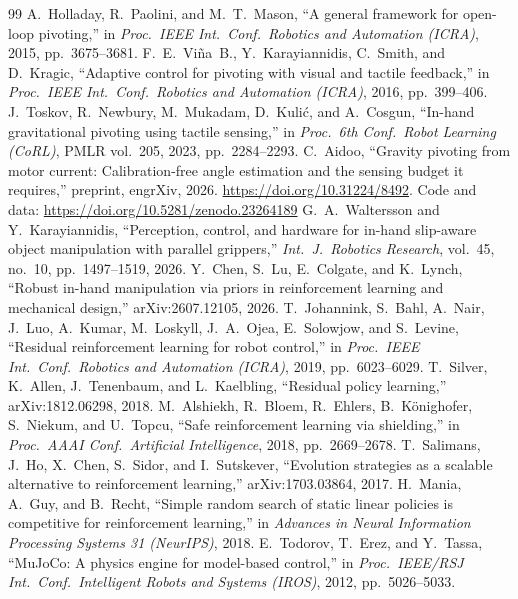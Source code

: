 \documentclass[11pt]{article}
\begin{document}
\begin{thebibliography}{99}
 A.~Holladay, R.~Paolini, and M.~T.~Mason, ``A general framework for open-loop pivoting,'' in \emph{Proc.\ IEEE Int.\ Conf.\ Robotics and Automation (ICRA)}, 2015, pp.~3675--3681.
 F.~E.~Vi\~na~B., Y.~Karayiannidis, C.~Smith, and D.~Kragic, ``Adaptive control for pivoting with visual and tactile feedback,'' in \emph{Proc.\ IEEE Int.\ Conf.\ Robotics and Automation (ICRA)}, 2016, pp.~399--406.
 J.~Toskov, R.~Newbury, M.~Mukadam, D.~Kuli\'c, and A.~Cosgun, ``In-hand gravitational pivoting using tactile sensing,'' in \emph{Proc.\ 6th Conf.\ Robot Learning (CoRL)}, PMLR vol.~205, 2023, pp.~2284--2293.
 C.~Aidoo, ``Gravity pivoting from motor current: Calibration-free angle estimation and the sensing budget it requires,'' preprint, engrXiv, 2026. \url{https://doi.org/10.31224/8492}. Code and data: \url{https://doi.org/10.5281/zenodo.23264189}
 G.~A.~Waltersson and Y.~Karayiannidis, ``Perception, control, and hardware for in-hand slip-aware object manipulation with parallel grippers,'' \emph{Int.\ J.\ Robotics Research}, vol.~45, no.~10, pp.~1497--1519, 2026.
 Y.~Chen, S.~Lu, E.~Colgate, and K.~Lynch, ``Robust in-hand manipulation via priors in reinforcement learning and mechanical design,'' arXiv:2607.12105, 2026.
 T.~Johannink, S.~Bahl, A.~Nair, J.~Luo, A.~Kumar, M.~Loskyll, J.~A.~Ojea, E.~Solowjow, and S.~Levine, ``Residual reinforcement learning for robot control,'' in \emph{Proc.\ IEEE Int.\ Conf.\ Robotics and Automation (ICRA)}, 2019, pp.~6023--6029.
 T.~Silver, K.~Allen, J.~Tenenbaum, and L.~Kaelbling, ``Residual policy learning,'' arXiv:1812.06298, 2018.
 M.~Alshiekh, R.~Bloem, R.~Ehlers, B.~K\"onighofer, S.~Niekum, and U.~Topcu, ``Safe reinforcement learning via shielding,'' in \emph{Proc.\ AAAI Conf.\ Artificial Intelligence}, 2018, pp.~2669--2678.
 T.~Salimans, J.~Ho, X.~Chen, S.~Sidor, and I.~Sutskever, ``Evolution strategies as a scalable alternative to reinforcement learning,'' arXiv:1703.03864, 2017.
 H.~Mania, A.~Guy, and B.~Recht, ``Simple random search of static linear policies is competitive for reinforcement learning,'' in \emph{Advances in Neural Information Processing Systems 31 (NeurIPS)}, 2018.
 E.~Todorov, T.~Erez, and Y.~Tassa, ``MuJoCo: A physics engine for model-based control,'' in \emph{Proc.\ IEEE/RSJ Int.\ Conf.\ Intelligent Robots and Systems (IROS)}, 2012, pp.~5026--5033.
\end{thebibliography}
\end{document}

